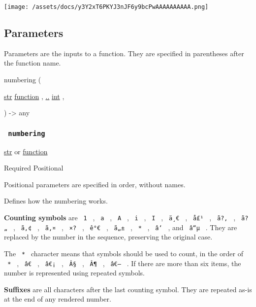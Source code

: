 \texttt{[image: /assets/docs/y3Y2xT6PKYJ3nJF6y9bcPwAAAAAAAAAA.png]}

\subsection{\texorpdfstring{{ Parameters
}}{ Parameters }}\label{parameters}

\label{parameters-tooltip}
Parameters are the inputs to a function. They are specified in
parentheses after the function name.

{ numbering } (

{ \href{/docs/reference/foundations/str/}{str}
\href{/docs/reference/foundations/function/}{function} , } {
\hyperref[parameters-numbers]{..}
\href{/docs/reference/foundations/int/}{int} , }

) -\textgreater{} { any }

\subsubsection{\texorpdfstring{\texttt{\ numbering\ }}{ numbering }}\label{parameters-numbering}

\href{/docs/reference/foundations/str/}{str} {or}
\href{/docs/reference/foundations/function/}{function}

{Required} {{ Positional }}

\label{parameters-numbering-positional-tooltip}
Positional parameters are specified in order, without names.

Defines how the numbering works.

\textbf{Counting symbols} are \texttt{\ 1\ } , \texttt{\ a\ } ,
\texttt{\ A\ } , \texttt{\ i\ } , \texttt{\ I\ } , \texttt{\ ä¸€\ } ,
\texttt{\ å£¹\ } , \texttt{\ ã?‚\ } , \texttt{\ ã?„\ } ,
\texttt{\ ã‚¢\ } , \texttt{\ ã‚¤\ } , \texttt{\ ×?\ } , \texttt{\ ê°€\ }
, \texttt{\ ã„±\ } , \texttt{\ *\ } , \texttt{\ â‘\ } , and
\texttt{\ â“µ\ } . They are replaced by the number in the sequence,
preserving the original case.

The \texttt{\ *\ } character means that symbols should be used to count,
in the order of \texttt{\ *\ } , \texttt{\ â€\ } , \texttt{\ â€¡\ } ,
\texttt{\ Â§\ } , \texttt{\ Â¶\ } , \texttt{\ â€–\ } . If there are more
than six items, the number is represented using repeated symbols.

\textbf{Suffixes} are all characters after the last counting symbol.
They are repeated as-is at the end of any rendered number.

